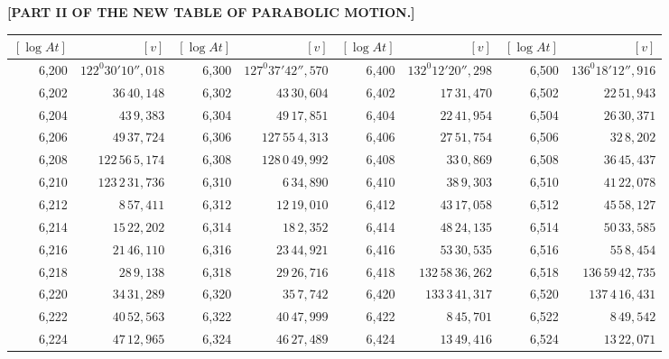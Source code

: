 \clearpage
{}
\begingroup
\centering
\fontsize{9}{9}\selectfont
\setlength{\tabcolsep}{.2pt}
\renewcommand{\arraystretch}{.9}
\setlength{\parskip}{0pt}
\textbf{[PART II OF THE NEW TABLE OF PARABOLIC MOTION.]}
\par\vspace{7pt}
\begin{tabular}{|r|r||r|r||r|r||r|r|}
\hline
\([\log At]\) & \([v]\) & \([\log At]\) & \([v]\) & \([\log At]\) & \([v]\) & \([\log At]\) & \([v]\) \\
\hline
6,200 & \(122^{0}30'10'',\!018\) & 6,300 & \(127^{0}37'42'',\!570\) & 6,400 & \(132^{0}12'20'',\!298\) & 6,500 & \(136^{0}18'12'',\!916\) \\[1pt]
6,202 & \(36\,40,\!148\) & 6,302 & \(43\,30,\!604\) & 6,402 & \(17\,31,\!470\) & 6,502 & \(22\,51,\!943\) \\
6,204 & \(43\,9,\!383\) & 6,304 & \(49\,17,\!851\) & 6,404 & \(22\,41,\!954\) & 6,504 & \(26\,30,\!371\) \\
6,206 & \(49\,37,\!724\) & 6,306 & \(127\,55\,4,\!313\) & 6,406 & \(27\,51,\!754\) & 6,506 & \(32\,8,\!202\) \\
6,208 & \(122\,56\,5,\!174\) & 6,308 & \(128\,0\,49,\!992\) & 6,408 & \(33\,0,\!869\) & 6,508 & \(36\,45,\!437\) \\
6,210 & \(123\,2\,31,\!736\) & 6,310 & \(6\,34,\!890\) & 6,410 & \(38\,9,\!303\) & 6,510 & \(41\,22,\!078\) \\[1pt]
6,212 & \(8\,57,\!411\) & 6,312 & \(12\,19,\!010\) & 6,412 & \(43\,17,\!058\) & 6,512 & \(45\,58,\!127\) \\
6,214 & \(15\,22,\!202\) & 6,314 & \(18\,2,\!352\) & 6,414 & \(48\,24,\!135\) & 6,514 & \(50\,33,\!585\) \\
6,216 & \(21\,46,\!110\) & 6,316 & \(23\,44,\!921\) & 6,416 & \(53\,30,\!535\) & 6,516 & \(55\,8,\!454\) \\
6,218 & \(28\,9,\!138\) & 6,318 & \(29\,26,\!716\) & 6,418 & \(132\,58\,36,\!262\) & 6,518 & \(136\,59\,42,\!735\) \\
6,220 & \(34\,31,\!289\) & 6,320 & \(35\,7,\!742\) & 6,420 & \(133\,3\,41,\!317\) & 6,520 & \(137\,4\,16,\!431\) \\[1pt]
6,222 & \(40\,52,\!563\) & 6,322 & \(40\,47,\!999\) & 6,422 & \(8\,45,\!701\) & 6,522 & \(8\,49,\!542\) \\
6,224 & \(47\,12,\!965\) & 6,324 & \(46\,27,\!489\) & 6,424 & \(13\,49,\!416\) & 6,524 & \(13\,22,\!071\) \\

\end{tabular}
